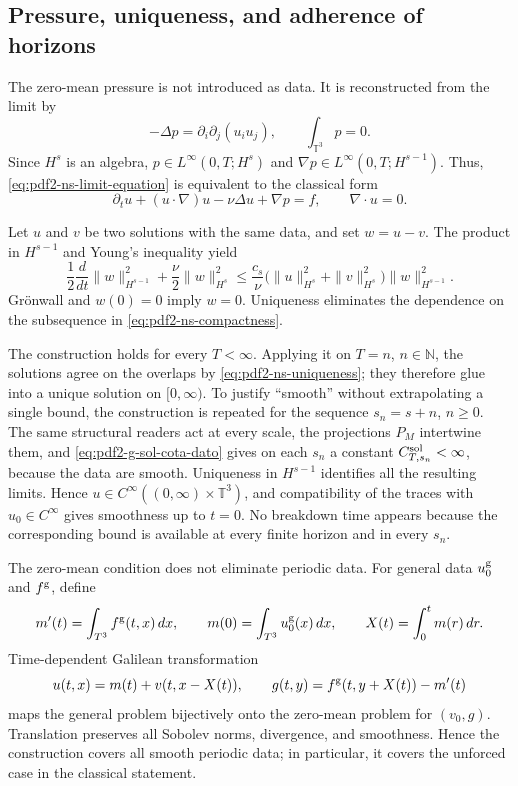\subsection{Pressure, uniqueness, and adherence of horizons}

The zero-mean pressure is not introduced as data. It is reconstructed from the limit by
\begin{equation}\label{eq:pdf2-ns-pressure}
 -\Delta p=\partial_i\partial_j(u_i u_j),
 \qquad \int_{\mathbb T^3}p=0.
\end{equation}
Since $H^s$ is an algebra, $p\in L^\infty(0,T;H^s)$ and
$\nabla p\in L^\infty(0,T;H^{s-1})$. Thus,
\eqref{eq:pdf2-ns-limit-equation} is equivalent to the classical form
\[
 \partial_tu+(u\cdot\nabla)u-\nu\Delta u+\nabla p=f,
 \qquad\nabla\!\cdot u=0.
\]

Let $u$ and $v$ be two solutions with the same data, and set $w=u-v$. The product
in $H^{s-1}$ and Young's inequality yield
\begin{equation}\label{eq:pdf2-ns-uniqueness}
 \frac12\frac{d}{dt}\|w\|_{H^{s-1}}^2
 +\frac\nu2\|w\|_{H^s}^2
 \le \frac{c_s}{\nu}
 \bigl(\|u\|_{H^s}^2+\|v\|_{H^s}^2\bigr)
 \|w\|_{H^{s-1}}^2.
\end{equation}
Grönwall and $w(0)=0$ imply $w=0$. Uniqueness eliminates the dependence on the
subsequence in \eqref{eq:pdf2-ns-compactness}.

The construction holds for every $T<\infty$. Applying it on $T=n$, $n\in\mathbb N$, the solutions agree on the overlaps by \eqref{eq:pdf2-ns-uniqueness}; they therefore glue into a unique solution on $[0,\infty)$. To justify ``smooth'' without extrapolating a single bound, the construction is repeated for the sequence $s_n=s+n$, $n\ge0$. The same structural readers act at every scale, the projections $P_M$ intertwine them, and \eqref{eq:pdf2-g-sol-cota-dato} gives on each $s_n$ a constant $C_{T,s_n}^{\rm sol}<\infty$, because the data are smooth. Uniqueness in $H^{s-1}$ identifies all the resulting limits. Hence $u\in C^\infty((0,\infty)\times\mathbb T^3)$, and compatibility of the traces with $u_0\in C^\infty$ gives smoothness up to $t=0$. No breakdown time appears because the corresponding bound is available at every finite horizon and in every $s_n$.

The zero-mean condition does not eliminate periodic data. For general data
$u_0^{\rm g}$ and $f^{\rm g}$, define
\[
 m'(t)=\int_{\mathbb T^3}f^{\rm g}(t,x)\,dx,\qquad
 m(0)=\int_{\mathbb T^3}u_0^{\rm g}(x)\,dx,\qquad
 X(t)=\int_0^tm(r)\,dr.
\]
Time-dependent Galilean transformation
\begin{equation}\label{eq:pdf2-ns-mean-reduction}
 u(t,x)=m(t)+v(t,x-X(t)),\qquad
 g(t,y)=f^{\rm g}(t,y+X(t))-m'(t)
\end{equation}
maps the general problem bijectively onto the zero-mean problem
for $(v_0,g)$. Translation preserves all Sobolev norms,
divergence, and smoothness. Hence the construction covers all smooth periodic
data; in particular, it covers the unforced case in the classical statement.

